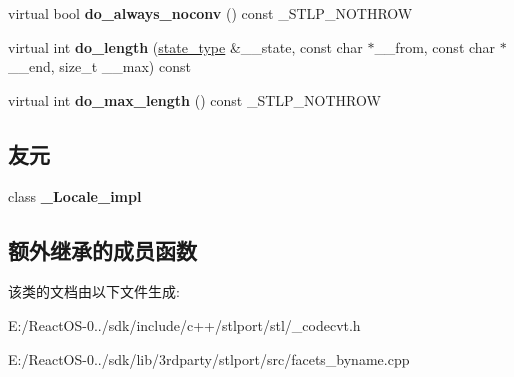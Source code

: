 \begin{DoxyCompactItemize}
virtual bool {\bfseries do\+\_\+always\+\_\+noconv} () const \+\_\+\+S\+T\+L\+P\+\_\+\+N\+O\+T\+H\+R\+OW
\item 
\mbox{\label{classcodecvt__byname_3_01wchar__t_00_01char_00_01mbstate__t_01_4_a93ab14331b0f5bed9e4bd0fc428eb833}} 
virtual int {\bfseries do\+\_\+length} (\hyperlink{struct____mbstate__t}{state\+\_\+type} \&\+\_\+\+\_\+state, const char $\ast$\+\_\+\+\_\+from, const char $\ast$\+\_\+\+\_\+end, size\+\_\+t \+\_\+\+\_\+max) const
\item 
\mbox{\label{classcodecvt__byname_3_01wchar__t_00_01char_00_01mbstate__t_01_4_abb99c477263b54d82f207cc2a2d0409a}} 
virtual int {\bfseries do\+\_\+max\+\_\+length} () const \+\_\+\+S\+T\+L\+P\+\_\+\+N\+O\+T\+H\+R\+OW
\end{DoxyCompactItemize}
\subsection*{友元}
\begin{DoxyCompactItemize}
\item 
\mbox{\label{classcodecvt__byname_3_01wchar__t_00_01char_00_01mbstate__t_01_4_ae9c09ac7cd16ad35f8fdb1587ac77eb8}} 
class {\bfseries \+\_\+\+Locale\+\_\+impl}
\end{DoxyCompactItemize}
\subsection*{额外继承的成员函数}


该类的文档由以下文件生成\+:\begin{DoxyCompactItemize}
\item 
E\+:/\+React\+O\+S-\/0../sdk/include/c++/stlport/stl/\+\_\+codecvt.\+h\item 
E\+:/\+React\+O\+S-\/0../sdk/lib/3rdparty/stlport/src/facets\+\_\+byname.\+cpp\end{DoxyCompactItemize}
